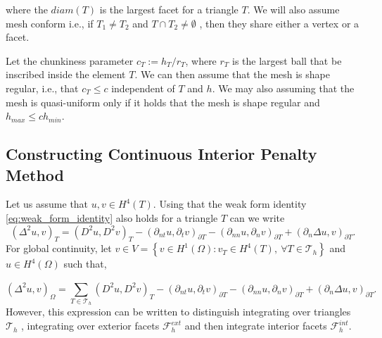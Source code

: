 where the $diam( T )$ is the largest facet for a triangle $T$. We will also assume mesh conform i.e., if $T_{1} \neq T_{2 }$  and $T \cap T_{2} \neq \emptyset  $ , then they share either a vertex or a facet.

Let the chunkiness parameter $c_{T} := h_{T}/r_{T}$, where $r_{T}$  is the largest ball that be inscribed inside the element $T$. We can then assume that the mesh is shape regular, i.e., that $c_{T}\le  c$ independent of $T$  and $h$. We may also assuming that
the mesh is quasi-uniform only if it holds that the mesh is shape regular and $h_{max} \le  c h_{min}$.




\subsection{Constructing Continuous Interior Penalty Method}%
\label{sub:constructing_continious_interior_penalty_method}

 Let us assume that $u,v \in
H^{4}\left( T  \right) $. Using that the weak form identity \eqref{eq:weak_form_identity} also holds for a triangle $T$ can we write
\begin{equation}
\label{eq:bi_basic_dg}
\left( \Delta  ^{2} u,v \right) _{T} =  \left( D^2u,D^2v \right) _{T } - \left(\partial _{nt} u, \partial _{t}v
\right)_{\partial T} - \left(\partial _{nn} u, \partial _{n}v \right)_{\partial T} + \left(\partial _{n} \Delta  u,v
\right)_{\partial T}
.\end{equation}
For global continuity, let  $v \in V =  \left\{ v \in H^{1}\left( \Omega  \right): v_{T} \in  H^{4}\left( T \right), \ \forall T \in
\mathcal{T}_{h}    \right\} $ and $u \in  H^{4}\left( \Omega  \right) $ such that,

\begin{equation}
\label{eq:bi_basic_dg2}
\left( \Delta  ^{2} u,v \right) _{\Omega } = \sum_{T \in  \mathcal{T} _{h}}^{}  \left( D^2u,D^2v \right) _{T } - \left(\partial _{nt} u, \partial _{t}v
\right)_{\partial T} - \left(\partial _{nn} u, \partial _{n}v \right)_{\partial T} + \left(\partial _{n} \Delta  u,v
\right)_{\partial T}.
\end{equation}
However, this expression can be written to distinguish integrating over triangles $\mathcal{T} _{h}$ , integrating over exterior facets $\mathcal{F} _{h}^{ext}$ and then integrate interior facets $\mathcal{F} _{h}^{int}$.


